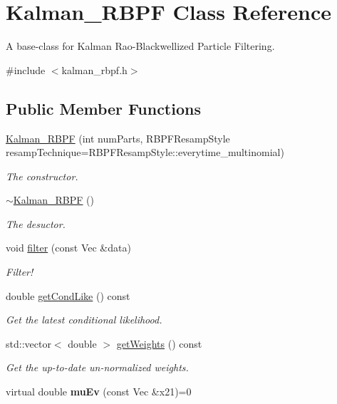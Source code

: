 \hypertarget{classKalman__RBPF}{}\section{Kalman\+\_\+\+R\+B\+PF Class Reference}
\label{classKalman__RBPF}


A base-\/class for Kalman Rao-\/\+Blackwellized Particle Filtering.  




{\ttfamily \#include $<$kalman\+\_\+rbpf.\+h$>$}

\subsection*{Public Member Functions}
\begin{DoxyCompactItemize}
\item 
\hyperlink{classKalman__RBPF_aa7130565819b45f993100dbf7f048c37}{Kalman\+\_\+\+R\+B\+PF} (int num\+Parts, R\+B\+P\+F\+Resamp\+Style resamp\+Technique=R\+B\+P\+F\+Resamp\+Style\+::everytime\+\_\+multinomial)
\begin{DoxyCompactList}\small\item\em The constructor. \end{DoxyCompactList}\item 
\hyperlink{classKalman__RBPF_a454f1736e8889904f755ca904f6eebc0}{$\sim$\+Kalman\+\_\+\+R\+B\+PF} ()\hypertarget{classKalman__RBPF_a454f1736e8889904f755ca904f6eebc0}{}\label{classKalman__RBPF_a454f1736e8889904f755ca904f6eebc0}

\begin{DoxyCompactList}\small\item\em The desuctor. \end{DoxyCompactList}\item 
void \hyperlink{classKalman__RBPF_a72d5ed61d0289a6977bf178145f5b969}{filter} (const Vec \&data)
\begin{DoxyCompactList}\small\item\em Filter! \end{DoxyCompactList}\item 
double \hyperlink{classKalman__RBPF_a2d65ffce3d115ecaf1c8e97b9222cdde}{get\+Cond\+Like} () const 
\begin{DoxyCompactList}\small\item\em Get the latest conditional likelihood. \end{DoxyCompactList}\item 
std\+::vector$<$ double $>$ \hyperlink{classKalman__RBPF_a8d411f1992b9a09ac3ee70f48ed34c7c}{get\+Weights} () const 
\begin{DoxyCompactList}\small\item\em Get the up-\/to-\/date un-\/normalized weights. \end{DoxyCompactList}\item 
virtual double {\bfseries mu\+Ev} (const Vec \&x21)=0\hypertarget{classKalman__RBPF_a25e8682d13a04eb1075a4d30dfa6825a}{}\label{classKalman__RBPF_a25e8682d13a04eb1075a4d30dfa6825a}


\end{DoxyCompactItemize}
